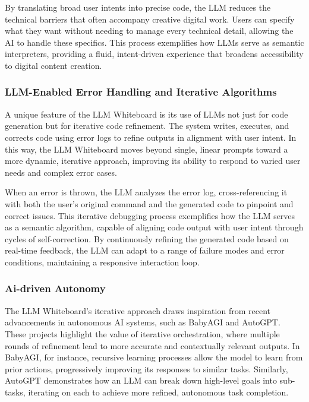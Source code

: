 By translating broad user intents into precise code, the LLM reduces the technical barriers that often accompany creative digital work.
Users can specify what they want without needing to manage every technical detail, allowing the AI to handle these specifics.
This process exemplifies how LLMs serve as semantic interpreters, providing a fluid, intent-driven experience that broadens accessibility to digital content creation.

\subsubsection{LLM-Enabled Error Handling and Iterative Algorithms}

A unique feature of the LLM Whiteboard is its use of LLMs not just for code generation but for iterative code refinement.
The system writes, executes, and corrects code using error logs to refine outputs in alignment with user intent.
In this way, the LLM Whiteboard moves beyond single, linear prompts toward a more dynamic, iterative approach, improving its ability to respond to varied user needs and complex error cases.

When an error is thrown, the LLM analyzes the error log, cross-referencing it with both the user’s original command and the generated code to pinpoint and correct issues.
This iterative debugging process exemplifies how the LLM serves as a semantic algorithm, capable of aligning code output with user intent through cycles of self-correction.
By continuously refining the generated code based on real-time feedback, the LLM can adapt to a range of failure modes and error conditions, maintaining a responsive interaction loop.

\subsubsection{Ai-driven Autonomy}
The LLM Whiteboard’s iterative approach draws inspiration from recent advancements in autonomous AI systems, such as BabyAGI\cite{nakajima2024} and AutoGPT\cite{autogpt2024}.
These projects highlight the value of iterative orchestration, where multiple rounds of refinement lead to more accurate and contextually relevant outputs.
In BabyAGI, for instance, recursive learning processes allow the model to learn from prior actions, progressively improving its responses to similar tasks.
Similarly, AutoGPT demonstrates how an LLM can break down high-level goals into sub-tasks, iterating on each to achieve more refined, autonomous task completion.


